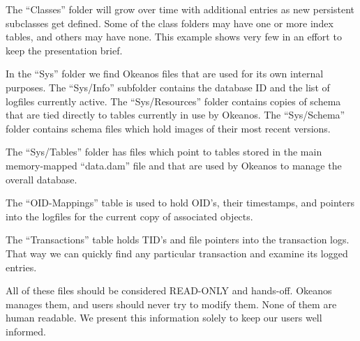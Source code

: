 \documentclass[article,oneside]{memoir}
\begin{document}
The ``Classes'' folder will grow over time with additional entries as new persistent subclasses get defined. Some of the class folders may have one or more index tables, and others may have none. This example shows very few in an effort to keep the presentation brief.

In the ``Sys'' folder we find Okeanos files that are used for its own internal purposes. The ``Sys/Info'' subfolder contains the database ID and the list of logfiles currently active. The ``Sys/Resources'' folder contains copies of schema that are tied directly to tables currently in use by Okeanos. The ``Sys/Schema'' folder contains schema files which hold images of their most recent versions.

The ``Sys/Tables'' folder has files which point to tables stored in the main memory-mapped ``data.dam'' file and that are used by Okeanos to manage the overall database. 

The ``OID-Mappings'' table is used to hold OID's, their timestamps, and pointers into the logfiles for the current copy of associated objects. 

The ``Transactions'' table holds TID's and file pointers into the transaction logs. That way we can quickly find any particular transaction and examine its logged entries.

All of these files should be considered READ-ONLY and hands-off. Okeanos manages them, and users should never try to modify them. None of them are human readable. We present this information solely to keep our users well informed.
\end{document}
